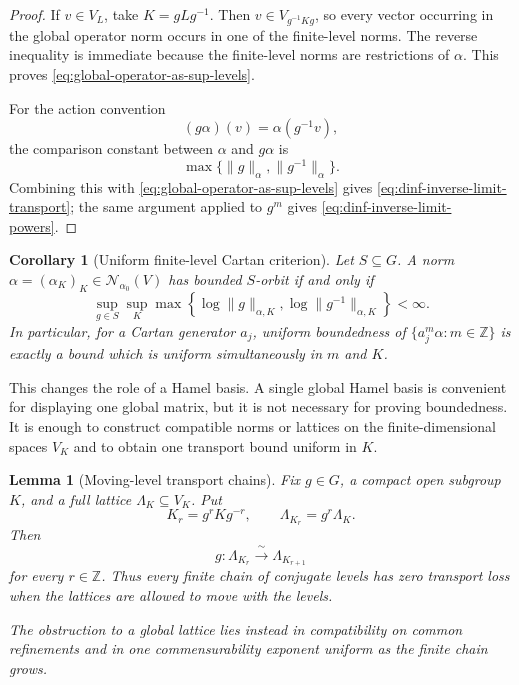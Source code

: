 \documentclass[12pt]{article}
\newtheorem{lemma}[theorem]{Lemma}
\newtheorem{corollary}[theorem]{Corollary}
\theoremstyle{definition}
\theoremstyle{remark}
\newcommand{\Norm}{\mathscr N}
\begin{document}
\begin{proof}
If \(v\in V_L\), take \(K=gLg^{-1}\).  Then
\(v\in V_{g^{-1}Kg}\), so every vector occurring in the global operator norm
occurs in one of the finite-level norms.  The reverse inequality is
immediate because the finite-level norms are restrictions of \(\alpha\).
This proves \eqref{eq:global-operator-as-sup-levels}.

For the action convention
\[
 (g\alpha)(v)=\alpha(g^{-1}v),
\]
the comparison constant between \(\alpha\) and \(g\alpha\) is
\[
 \max\{\|g\|_\alpha,\|g^{-1}\|_\alpha\}.
\]
Combining this with \eqref{eq:global-operator-as-sup-levels} gives
\eqref{eq:dinf-inverse-limit-transport}; the same argument applied to
\(g^m\) gives \eqref{eq:dinf-inverse-limit-powers}.
\end{proof}

\begin{corollary}[Uniform finite-level Cartan criterion]
\label{cor:uniform-finite-level-Cartan}
Let \(S\subseteq G\).  A norm
\(\alpha=(\alpha_K)_K\in\Norm_{\alpha_0}(V)\) has bounded \(S\)-orbit if and
only if
\[
 \sup_{g\in S}\sup_K
 \max\left\{
 \log\|g\|_{\alpha,K},
 \log\|g^{-1}\|_{\alpha,K}
 \right\}
 <\infty.
\]
In particular, for a Cartan generator \(a_j\), uniform boundedness of
\(\{a_j^m\alpha:m\in\mathbb Z\}\) is exactly a bound which is uniform
simultaneously in \(m\) and \(K\).
\end{corollary}

This changes the role of a Hamel basis.  A single global Hamel basis is
convenient for displaying one global matrix, but it is not necessary for
proving boundedness.  It is enough to construct compatible norms or lattices
on the finite-dimensional spaces \(V_K\) and to obtain one transport bound
uniform in \(K\).

\begin{lemma}[Moving-level transport chains]
\label{lem:moving-level-transport-chain}
Fix \(g\in G\), a compact open subgroup \(K\), and a full lattice
\(\Lambda_K\subseteq V_K\).  Put
\[
 K_r=g^rKg^{-r},
 \qquad
 \Lambda_{K_r}=g^r\Lambda_K.
\]
Then
\[
 g:\Lambda_{K_r}\xrightarrow{\ \sim\ }\Lambda_{K_{r+1}}
\]
for every \(r\in\mathbb Z\).  Thus every finite chain of conjugate levels
has zero transport loss when the lattices are allowed to move with the
levels.

The obstruction to a global lattice lies instead in compatibility on common
refinements and in one commensurability exponent uniform as the finite chain
grows.
\end{lemma}
\end{document}

